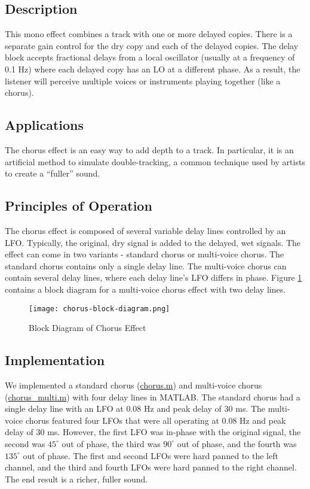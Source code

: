 \subsection{Description}
This mono effect combines a track with one or more delayed copies. There is a separate gain control for the dry copy and each of the delayed copies. The delay block accepts fractional delays from a local oscillator (usually at a frequency of 0.1 Hz) where each delayed copy has an LO at a different phase. As a result, the listener will perceive multiple voices or instruments playing together (like a chorus).

\subsection{Applications}
The chorus effect is an easy way to add depth to a track. In particular, it is an artificial method to simulate double-tracking, a common technique used by artists to create a ``fuller'' sound.

\subsection{Principles of Operation}
The chorus effect is composed of several variable delay lines controlled by an LFO. Typically, the original, dry signal is added to the delayed, wet signals. The effect can come in two variants - standard chorus or multi-voice chorus. The standard chorus contains only a single delay line. The multi-voice chorus can contain several delay lines, where each delay line's LFO differs in phase. Figure \ref{fig:chorus-block-diagram} contains a block diagram for a multi-voice chorus effect with two delay lines.
\begin{figure}[ht]
    \centering
    \texttt{[image: chorus-block-diagram.png]}
    \caption{Block Diagram of Chorus Effect}
    \label{fig:chorus-block-diagram}
\end{figure}

\subsection{Implementation}
We implemented a standard chorus (\href{run:../chorus.m}{chorus.m}) and multi-voice chorus (\href{run:../chorus_multi.m}{chorus\_multi.m}) with four delay lines in MATLAB. The standard chorus had a single delay line with an LFO at 0.08 Hz and peak delay of 30 ms. The multi-voice chorus featured four LFOs that were all operating at 0.08 Hz and peak delay of 30 ms. However, the first LFO was in-phase with the original signal, the second was $45^\circ$ out of phase, the third was $90^\circ$ out of phase, and the fourth was $135^\circ$ out of phase. The first and second LFOs were hard panned to the left channel, and the third and fourth LFOs were hard panned to the right channel. The end result is a richer, fuller sound.

